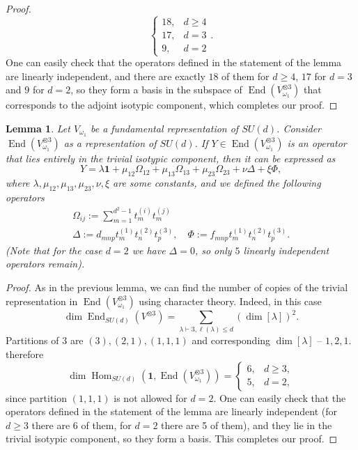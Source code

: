 \documentclass[10pt,twocolumn,superscriptaddress,aps,amsmath,amssymb,citeautoscript,floatfix,prx]{revtex4-2}
\theoremstyle{plain}
\theoremstyle{plain}
\theoremstyle{plain}
\theoremstyle{plain}
\theoremstyle{plain}
\theoremstyle{plain}
\theoremstyle{plain}
\newtheorem{smlemma}[smtheorem]{Lemma}
\theoremstyle{definition}
\theoremstyle{plain}
\begin{document}
\begin{appendix}
\begin{proof}
    \[
        \begin{cases}18, & d \geq 4 \\ 17, & d=3 \\ 9, & d=2\end{cases}.
    \]
    One can easily check that the operators defined in the statement of the lemma are linearly independent, and there are exactly $18$ of them for $d \geq 4$, $17$ for $d=3$ and $9$ for $d=2$, 
    so they form a basis in the subspace of $\operatorname{End}(V_{\omega_1}^{\otimes 3})$ that corresponds to the adjoint isotypic component, which completes our proof.
\end{proof}

\begin{smlemma}\label{lem:trivial-3site}
    Let $V_{\omega_1}$ be a fundamental representation of $SU(d)$. Consider $\operatorname{End}(V_{\omega_1}^{\otimes 3})$ as a representation of $SU(d)$. 
    If $Y\in \operatorname{End}(V_{\omega_1}^{\otimes 3})$ is an operator that lies entirely in the trivial isotypic component, then it can be expressed as
    \[
        Y=\lambda \mathbf{1}+\mu_{12} \Omega_{12}+\mu_{13} \Omega_{13}+\mu_{23} \Omega_{23}+\nu \Delta+\xi \Phi,
    \]
    where $\lambda, \mu_{12}, \mu_{13}, \mu_{23}, \nu, \xi$ are some constants, and we defined the following operators
    \[
        \begin{gathered}
        \Omega_{i j}:=\sum_{m=1}^{d^2-1} t_m^{(i)} t_m^{(j)} \\
        \Delta:=d_{m n p} t_m^{(1)} t_n^{(2)} t_p^{(3)}, \quad \Phi:=f_{m n p} t_m^{(1)} t_n^{(2)} t_p^{(3)}.
        \end{gathered}
    \]
    (Note that for the case $d=2$ we have $\Delta=0$, so only $5$ linearly independent operators remain).
\end{smlemma}

\begin{proof}
    As in the previous lemma, we can find the number of copies of the trivial representation in $\operatorname{End}(V_{\omega_1}^{\otimes 3})$ using character theory. Indeed, in this case
    \[
        \operatorname{dim} \operatorname{End}_{S U(d)}\left(V^{\otimes 3}\right)=\sum_{\lambda \vdash 3, \ell(\lambda) \leq d}(\operatorname{dim}[\lambda])^2.
    \]
    Partitions of 3 are $(3),(2,1),(1,1,1)$ and corresponding $\operatorname{dim}[\lambda]$ -- $1,2,1$. therefore
    \[
        \operatorname{dim} \operatorname{Hom}_{S U(d)}\left(\mathbf{1}, \operatorname{End}\left(V_{\omega_1}^{\otimes 3}\right)\right)= \begin{cases}6, & d \geq 3, \\ 5, & d=2,\end{cases}
    \]
    since partition $(1,1,1)$ is not allowed for $d=2$. 
    One can easily check that the operators defined in the statement of the lemma are linearly independent (for $d\geq 3$ there are 6 of them, for $d=2$ there are 5 of them), 
    and they lie in the trivial isotypic component, so they form a basis.
    This completes our proof.
\end{proof}


\end{appendix}
\end{document}

